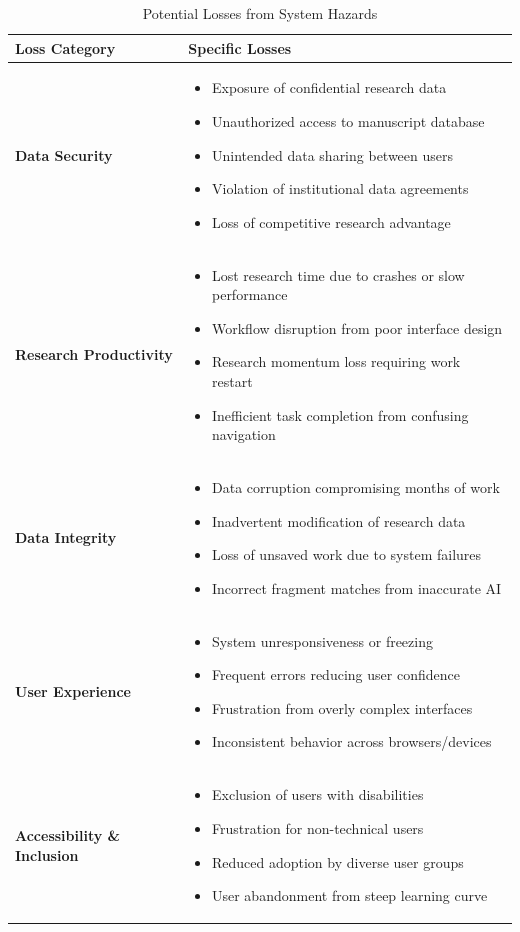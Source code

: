 \documentclass{article}
\begin{document}
\begin{table}[H]
\caption{Potential Losses from System Hazards} \label{TblPotentialLosses}
\begin{tabularx}{\textwidth}{lX}
\toprule
\textbf{Loss Category} & \textbf{Specific Losses}\\
\midrule
\textbf{Data Security} &
\begin{itemize}
\item Exposure of confidential research data
\item Unauthorized access to manuscript database
\item Unintended data sharing between users
\item Violation of institutional data agreements
\item Loss of competitive research advantage
\end{itemize}\\
\midrule
\textbf{Research Productivity} &
\begin{itemize}
\item Lost research time due to crashes or slow performance
\item Workflow disruption from poor interface design
\item Research momentum loss requiring work restart
\item Inefficient task completion from confusing navigation
\end{itemize}\\
\midrule
\textbf{Data Integrity} &
\begin{itemize}
\item Data corruption compromising months of work
\item Inadvertent modification of research data
\item Loss of unsaved work due to system failures
\item Incorrect fragment matches from inaccurate AI
\end{itemize}\\
\midrule
\textbf{User Experience} &
\begin{itemize}
\item System unresponsiveness or freezing
\item Frequent errors reducing user confidence
\item Frustration from overly complex interfaces
\item Inconsistent behavior across browsers/devices
\end{itemize}\\
\midrule
\textbf{Accessibility \& Inclusion} &
\begin{itemize}
\item Exclusion of users with disabilities
\item Frustration for non-technical users
\item Reduced adoption by diverse user groups
\item User abandonment from steep learning curve
\end{itemize}\\
\bottomrule
\end{tabularx}
\end{table}
\end{document}
